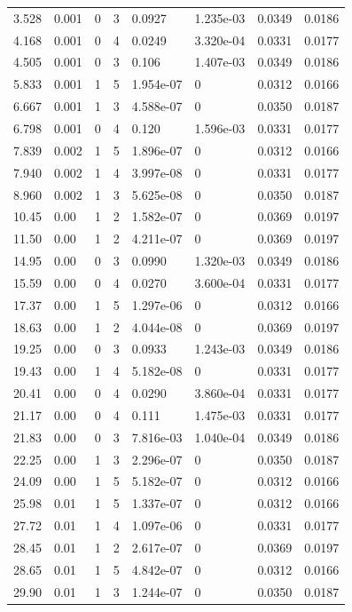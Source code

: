 \documentclass[preview]{standalone}
\begin{document}
{{\begin{tabular}{L{1.2cm}C{1.2cm} C{0.3cm}C{0.5cm} C{1.4cm}C{1.4cm} C{1.4cm}C{1.4cm}}
  3.528  &  0.001  & 0     &  3 &  0.0927  & 1.235e-03  & 0.0349 &  0.0186   \\ 
  4.168  &  0.001  & 0     &  4 &  0.0249  & 3.320e-04  & 0.0331 &  0.0177   \\ 
  4.505  &  0.001  & 0     &  3 &  0.106  & 1.407e-03  & 0.0349 &  0.0186   \\ 
  5.833  &  0.001  & 1     &  5 &  1.954e-07  & 0  & 0.0312 &  0.0166   \\ 
  6.667  &  0.001  & 1     &  3 &  4.588e-07  & 0  & 0.0350 &  0.0187   \\ 
  6.798  &  0.001  & 0     &  4 &  0.120  & 1.596e-03  & 0.0331 &  0.0177   \\ 
  7.839  &  0.002  & 1     &  5 &  1.896e-07  & 0  & 0.0312 &  0.0166   \\ 
  7.940  &  0.002  & 1     &  4 &  3.997e-08  & 0  & 0.0331 &  0.0177   \\ 
  8.960  &  0.002  & 1     &  3 &  5.625e-08  & 0  & 0.0350 &  0.0187   \\ 
  10.45  &  0.00  & 1     &  2 &  1.582e-07  & 0  & 0.0369 &  0.0197   \\ 
  11.50  &  0.00  & 1     &  2 &  4.211e-07  & 0  & 0.0369 &  0.0197   \\ 
  14.95  &  0.00  & 0     &  3 &  0.0990  & 1.320e-03  & 0.0349 &  0.0186   \\ 
  15.59  &  0.00  & 0     &  4 &  0.0270  & 3.600e-04  & 0.0331 &  0.0177   \\ 
  17.37  &  0.00  & 1     &  5 &  1.297e-06  & 0  & 0.0312 &  0.0166   \\ 
  18.63  &  0.00  & 1     &  2 &  4.044e-08  & 0  & 0.0369 &  0.0197   \\ 
  19.25  &  0.00  & 0     &  3 &  0.0933  & 1.243e-03  & 0.0349 &  0.0186   \\ 
  19.43  &  0.00  & 1     &  4 &  5.182e-08  & 0  & 0.0331 &  0.0177   \\ 
  20.41  &  0.00  & 0     &  4 &  0.0290  & 3.860e-04  & 0.0331 &  0.0177   \\ 
  21.17  &  0.00  & 0     &  4 &  0.111  & 1.475e-03  & 0.0331 &  0.0177   \\ 
  21.83  &  0.00  & 0     &  3 &  7.816e-03  & 1.040e-04  & 0.0349 &  0.0186   \\ 
  22.25  &  0.00  & 1     &  3 &  2.296e-07  & 0  & 0.0350 &  0.0187   \\ 
  24.09  &  0.00  & 1     &  5 &  5.182e-07  & 0  & 0.0312 &  0.0166   \\ 
  25.98  &  0.01  & 1     &  5 &  1.337e-07  & 0  & 0.0312 &  0.0166   \\ 
  27.72  &  0.01  & 1     &  4 &  1.097e-06  & 0  & 0.0331 &  0.0177   \\ 
  28.45  &  0.01  & 1     &  2 &  2.617e-07  & 0  & 0.0369 &  0.0197   \\ 
  28.65  &  0.01  & 1     &  5 &  4.842e-07  & 0  & 0.0312 &  0.0166   \\ 
  29.90  &  0.01  & 1     &  3 &  1.244e-07  & 0  & 0.0350 &  0.0187   \\ 
\hline 
\end{tabular} 

}}
\end{document}
